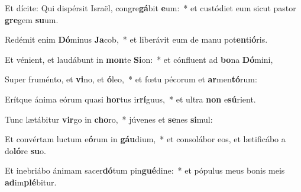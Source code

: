 \item Et dícite: Qui dispérsit Israël, congre\textbf{gá}bit \textbf{e}um:~* et custódiet eum sicut pastor \textbf{gre}gem \textbf{su}um.
\item Redémit enim \textbf{Dó}minus \textbf{Ja}cob,~* et liberávit eum de manu pot\textbf{en}ti\textbf{ó}ris.
\item Et vénient, et laudábunt in \textbf{mon}te \textbf{Si}on:~* et cónfluent ad \textbf{bo}na \textbf{Dó}mini,
\item Super fruménto, et \textbf{vi}no, et \textbf{ó}leo,~* et fœtu pécorum et \textbf{ar}men\textbf{tó}rum:
\item Erítque ánima eórum quasi \textbf{hor}tus ir\textbf{rí}guus,~* et ultra \textbf{non} e\textbf{sú}rient.
\item Tunc lætábitur \textbf{vir}go in \textbf{cho}ro,~* júvenes et \textbf{se}nes \textbf{si}mul:
\item Et convértam luctum e\textbf{ó}rum in \textbf{gáu}dium,~* et consolábor eos, et lætificábo a do\textbf{ló}re \textbf{su}o.
\item Et inebriábo ánimam sacer\textbf{dó}tum pin\textbf{gué}dine:~* et pópulus meus bonis meis \textbf{ad}im\textbf{plé}bitur.
